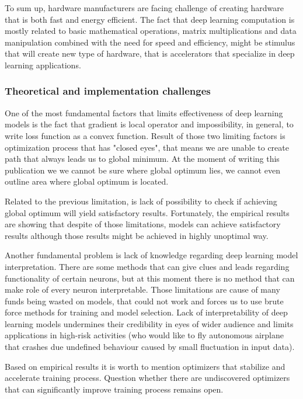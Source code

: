 \documentclass[10pt]{article}
\begin{document}
To sum up, hardware manufacturers are facing challenge of creating hardware that is both fast and energy efficient. The fact that deep learning computation is mostly related to basic mathematical operations, matrix multiplications and data manipulation combined with the need for speed and efficiency, might be stimulus that will create new type of hardware, that is accelerators that specialize in deep learning applications.
\subsubsection{Theoretical and implementation challenges}
One of the most fundamental factors that limits effectiveness of deep learning models is the fact that gradient is local operator and impossibility, in general, to write loss function as a convex function. Result of those two limiting factors is optimization process that has "closed eyes", that means we are unable to create path that always leads us to global minimum. At the moment of writing this publication we we cannot be sure where global optimum lies, we cannot even outline area where global optimum is located.

Related to the previous limitation, is lack of possibility to check if achieving global optimum will yield satisfactory results. Fortunately, the empirical results are showing that despite of those limitations, models can achieve satisfactory results although those results might be achieved in highly unoptimal way. 

Another fundamental problem is lack of knowledge regarding deep learning model interpretation. There are some methods that can give clues and leads regarding functionality of certain neurons, but at this moment there is no method that can make role of every neuron interpretable. Those limitations are cause of many funds being wasted on models, that could not work and forces us to use brute force methods for training and model selection. Lack of interpretability of deep learning models undermines their credibility in eyes of wider audience  and limits applications in high-risk activities (who would like to fly autonomous airplane that crashes due undefined behaviour caused by small fluctuation in input data).

Based on empirical results it is worth to mention optimizers that stabilize and accelerate training process. Question whether there are undiscovered optimizers that can significantly improve training process remains open. 
\end{document}
